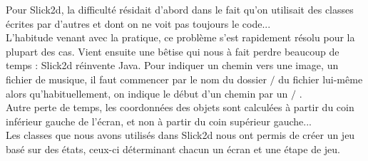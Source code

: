 \documentclass[a4paper,titlepage]{article}
\begin{document}
Pour Slick2d, la difficulté résidait d’abord dans le fait qu’on utilisait des classes écrites par d’autres et dont on ne voit pas toujours le code...\\ L’habitude venant avec la pratique, ce problème s’est rapidement résolu pour la plupart des cas. Vient ensuite une bêtise qui nous à fait perdre beaucoup de temps : Slick2d \og réinvente \fg{} Java. Pour indiquer un chemin vers une image, un fichier de musique, il faut commencer par le nom du dossier $/$ du fichier lui-même alors qu'habituellement, on indique le début d’un chemin par un \og $/$ \fg{}. \\

Autre perte de temps, les coordonnées des objets sont calculées à partir du coin inférieur gauche de l’écran, et non à partir du coin supérieur gauche...\\

Les classes que nous avons utilisés dans Slick2d nous ont permis de créer un jeu basé sur des états, ceux-ci déterminant chacun un écran et une étape de jeu.
\end{document}
